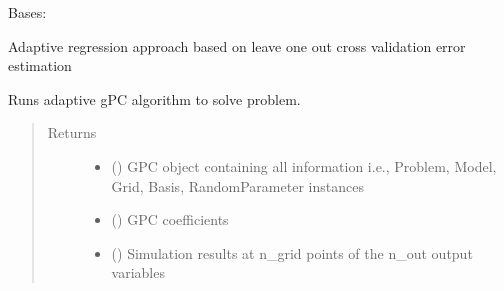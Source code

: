\documentclass[letterpaper,10pt,english,openany,oneside]{sphinxmanual}
\begin{document}
\begin{fulllineitems}
\label{\detokenize{pygpc:pygpc.Algorithm.RegAdaptive}}
Bases: {\hyperref[\detokenize{pygpc:pygpc.Algorithm.Algorithm}]{}}

Adaptive regression approach based on leave one out cross validation error estimation

\begin{fulllineitems}
\label{\detokenize{pygpc:pygpc.Algorithm.RegAdaptive.run}}
Runs adaptive gPC algorithm to solve problem.
\begin{quote}\begin{description}
\item[{Returns}] \leavevmode
\begin{itemize}
\item {} 
 () \textendash{} GPC object containing all information i.e., Problem, Model, Grid, Basis, RandomParameter instances

\item {} 
 () \textendash{} GPC coefficients

\item {} 
 () \textendash{} Simulation results at n\_grid points of the n\_out output variables

\end{itemize}


\end{description}\end{quote}

\end{fulllineitems}


\end{fulllineitems}

\end{document}
